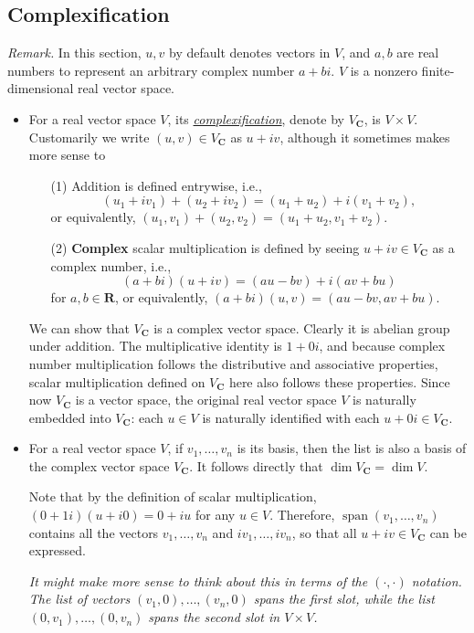 \documentclass[11pt]{article}
\newcommand{\df}[1]{\ul{\textit{\textsf{#1}}}}
\newcommand{\R}{\mathbf{R}}
\newcommand{\C}{\mathbf{C}}
\newcommand{\s}{\operatorname{span}}
\renewcommand{\d}{\dim}
\begin{document}
\subsection{Complexification}
\textit{Remark.} In this section, $u,v$ by default denotes vectors in $V$, and $a,b$ are real numbers to represent an arbitrary complex number $a+bi$. $V$ is a nonzero finite-dimensional real vector space.
\begin{itemize}
    \item For a real vector space $V$, its \df{complexification}, denote by $V_\C$, is $V \times V$. Customarily we write $(u,v) \in V_\C$ as $u + iv$, although it sometimes makes more sense to \emph{}
    \begin{enumerate}
        \item [(1)] Addition is defined entrywise, i.e., \[(u_1+iv_1)+(u_2+iv_2)=(u_1+u_2)+i(v_1+v_2),\] or equivalently, $(u_1,v_1)+(u_2,v_2) = (u_1+u_2,v_1+v_2)$.
        \item [(2)] \textbf{Complex} scalar multiplication is defined by seeing $u+iv \in V_\C$ as a complex number, i.e., \[(a+bi)(u+iv) = (au-bv)+i(av+bu)\] for $a,b \in \R$, or equivalently, $(a+bi)(u,v) = (au-bv,av+bu)$.
    \end{enumerate}

    We can show that $V_\C$ is a complex vector space. Clearly it is abelian group under addition. The multiplicative identity is $1+0i$, and because complex number multiplication follows the distributive and associative properties, scalar multiplication defined on $V_\C$ here also follows these properties. Since now $V_\C$ is a vector space, the original real vector space $V$ is naturally embedded into $V_\C$: each $u \in V$ is naturally identified with each $u+0i \in V_\C$.
    \item For a real vector space $V$, if $v_1,\dots,v_n$ is its basis, then the list is also a basis of the complex vector space $V_\C$. It follows directly that $\d V_\C = \d V$.

    Note that by the definition of scalar multiplication, $(0+1i)(u+i0) = 0+iu$ for any $u \in V$. Therefore, $\s(v_1,\dots,v_n)$ contains all the vectors $v_1,\dots,v_n$ and $iv_1,\dots,iv_n$, so that all $u+iv \in V_\C$ can be expressed.
    
    \emph{It might make more sense to think about this in terms of the $(\cdot,\cdot)$ notation. The list of vectors $(v_1,0),\dots,(v_n,0)$ spans the first slot, while the list $(0,v_1),\dots,(0,v_n)$ spans the second slot in $V \times V$.}


\end{itemize}
\end{document}
